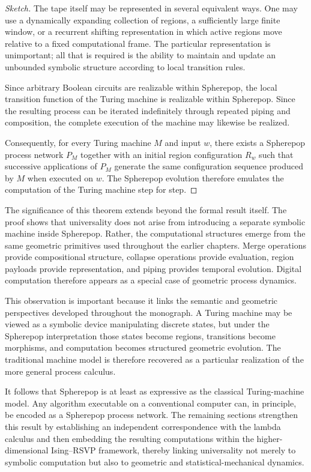 \documentclass[12pt,letterpaper]{article}
\theoremstyle{remark}
\begin{document}
\begin{proof}[Sketch]
The tape itself may be represented in several equivalent ways. One may use a dynamically expanding collection of regions, a sufficiently large finite window, or a recurrent shifting representation in which active regions move relative to a fixed computational frame. The particular representation is unimportant; all that is required is the ability to maintain and update an unbounded symbolic structure according to local transition rules.

Since arbitrary Boolean circuits are realizable within Spherepop, the local transition function of the Turing machine is realizable within Spherepop. Since the resulting process can be iterated indefinitely through repeated piping and composition, the complete execution of the machine may likewise be realized.

Consequently, for every Turing machine $M$ and input $w$, there exists a Spherepop process network $P_M$ together with an initial region configuration $R_w$ such that successive applications of $P_M$ generate the same configuration sequence produced by $M$ when executed on $w$. The Spherepop evolution therefore emulates the computation of the Turing machine step for step.
\end{proof}

The significance of this theorem extends beyond the formal result itself. The proof shows that universality does not arise from introducing a separate symbolic machine inside Spherepop. Rather, the computational structures emerge from the same geometric primitives used throughout the earlier chapters. Merge operations provide compositional structure, collapse operations provide evaluation, region payloads provide representation, and piping provides temporal evolution. Digital computation therefore appears as a special case of geometric process dynamics.

This observation is important because it links the semantic and geometric perspectives developed throughout the monograph. A Turing machine may be viewed as a symbolic device manipulating discrete states, but under the Spherepop interpretation those states become regions, transitions become morphisms, and computation becomes structured geometric evolution. The traditional machine model is therefore recovered as a particular realization of the more general process calculus.

It follows that Spherepop is at least as expressive as the classical Turing-machine model. Any algorithm executable on a conventional computer can, in principle, be encoded as a Spherepop process network. The remaining sections strengthen this result by establishing an independent correspondence with the lambda calculus and then embedding the resulting computations within the higher-dimensional Ising--RSVP framework, thereby linking universality not merely to symbolic computation but also to geometric and statistical-mechanical dynamics.
\end{document}
